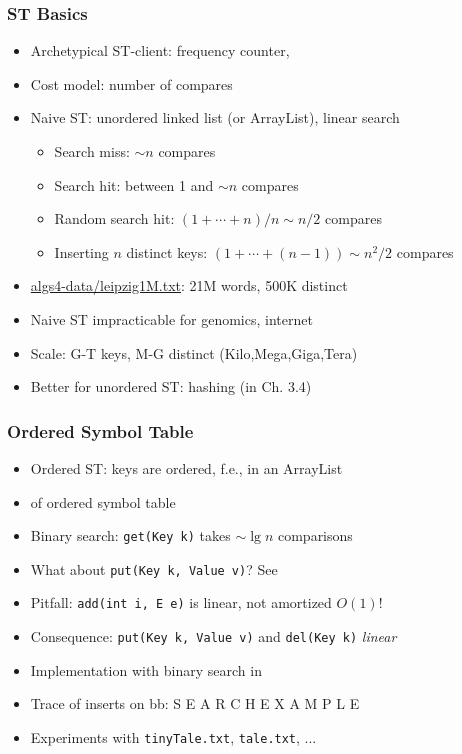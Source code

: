\documentclass[handout]{beamer}
\newcommand{\git}{https://github.com/marcbezem/INF102/blob/master}
\begin{document}
\begin{frame}
    \frametitle{ST Basics}

\begin{itemize}[<+->]
\item Archetypical ST-client: frequency counter, \href{\git/programs/searching/elementarySymbolTables/ArrayListST.java}%
{\color{red}{ArrayListST.main}}
\item Cost model: number of compares
\item Naive ST: unordered linked list (or ArrayList), linear search %
  \begin{itemize}[<+->]
  \item Search miss: $\sim n$ compares
  \item Search hit: between 1 and $\sim n$ compares
  \item Random search hit: $(1+\cdots+n)/n \sim n/2$ compares
  \item Inserting $n$ distinct keys: $(1+\cdots+(n-1)) \sim n^2/2$ compares
  \end{itemize}
\item \url{algs4-data/leipzig1M.txt}: 21M words, 500K distinct
\item Naive ST impracticable for genomics, internet
\item Scale: G-T keys, M-G distinct (Kilo,Mega,Giga,Tera)
\item Better for unordered ST: hashing (in Ch. 3.4)
\end{itemize}     
\end{frame}

\begin{frame}
    \frametitle{Ordered Symbol Table}

\begin{itemize}[<+->]
\item Ordered ST: keys are ordered, f.e., in an ArrayList
\item\href{http://algs4.cs.princeton.edu/code/javadoc/edu/princeton/cs/algs4/BinarySearchST.html}%
{\color{red}{API}} of ordered symbol table
\item Binary search: {\tt get(Key k)} takes $\sim \lg n$ comparisons
\item What about {\tt put(Key k, Value v)}? See
\href{http://docs.oracle.com/javase/7/docs/api/java/util/ArrayList.html}%
{\color{red}{ArrayList}}
\item Pitfall: {\tt add(int i, E e)} is linear, not amortized $O(1)$!
\item Consequence: {\tt put(Key k, Value v)} and {\tt del(Key k)} \emph{linear}
\item Implementation with binary search in
\href{\git/programs/searching/elementarySymbolTables/ArrayListST.java}%
{\color{red}{ArrayListST.java}}
\item Trace of inserts on bb: S E A R C H E X A M P L E
\item Experiments with {\tt tinyTale.txt}, {\tt tale.txt}, ... 
\end{itemize}     
\end{frame}
\end{document}
